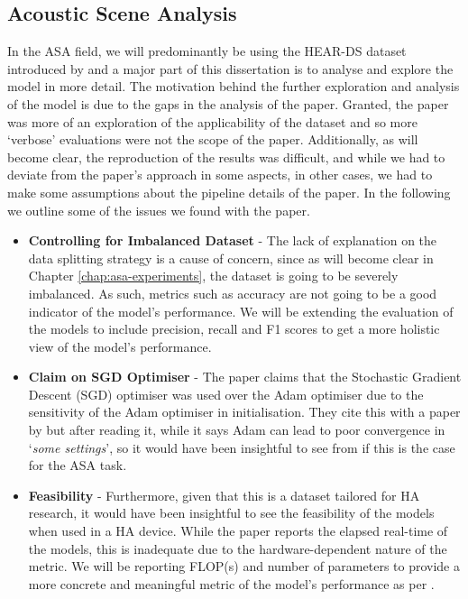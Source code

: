 \documentclass[logo,bsc,singlespacing,parskip,online]{infthesis}
\begin{document}
\subsection{Acoustic Scene Analysis}
In the ASA field, we will predominantly be using the HEAR-DS dataset introduced by \citet{Huwel2020HearDS}
and a major part of this dissertation is to analyse and explore the model in more detail.
The motivation behind the further exploration and analysis of the model is due
to the gaps in the analysis of the paper. Granted, the paper was more of an exploration of the applicability of the dataset 
and so more `verbose' evaluations were not the scope of the paper. 
Additionally, as will become clear, the reproduction of the results 
was difficult, and while we had to deviate from the paper's approach
in some aspects, in other cases, we had to make some assumptions
about the pipeline details of the paper. 
In the following we outline some of the issues we found with the paper.
\begin{itemize}
   \item \textbf{Controlling for Imbalanced Dataset} - The lack of explanation on the data splitting strategy 
   is a cause of concern, since as will become clear in Chapter \ref{chap:asa-experiments},
   the dataset is going to be severely imbalanced. As such, metrics such as accuracy are not going to be a good 
   indicator of the model's performance. We will be extending the evaluation of the models to include 
   precision, recall and F1 scores to get a more holistic view of the model's performance. 
   \item \textbf{Claim on SGD Optimiser} - The paper claims that the Stochastic Gradient Descent (SGD) 
   optimiser was used over the Adam optimiser due to the sensitivity of the Adam optimiser in 
   initialisation. They cite this with a paper by \citet{} 
   but after reading it, while it says 
   Adam can lead to poor convergence in `\textit{some settings}',
   so it would have been insightful to see from \citet{Huwel2020HearDS}
   if this is the case for the ASA task.
   \item \textbf{Feasibility} - Furthermore, given that 
   this is a dataset tailored for HA research, it would have been insightful 
   to see the feasibility of the models when used in a HA device. While the paper 
   reports the elapsed real-time of the models, this
   is inadequate due to the hardware-dependent nature of the metric. 
   We will be reporting FLOP(s) and number of parameters to provide a more 
   concrete and meaningful metric of the model's performance as per \citet{schwartz2019greenai}.
\end{itemize}
\end{document}

